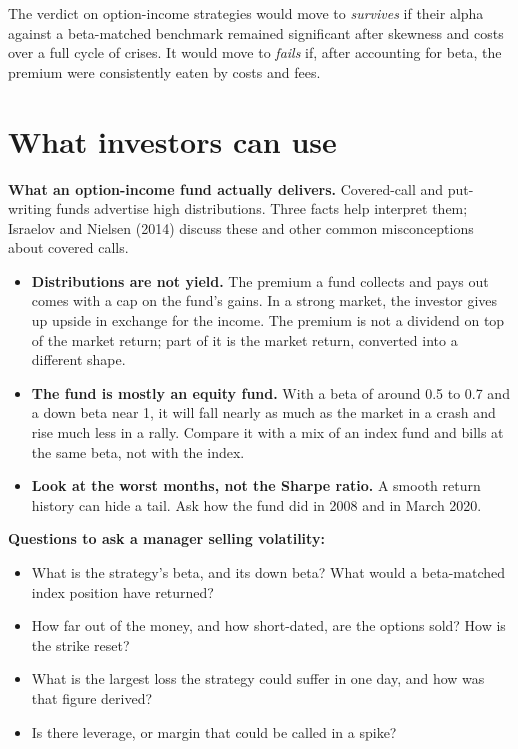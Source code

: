 The verdict on option-income strategies would move to \emph{survives} if their alpha against a beta-matched benchmark remained significant after skewness and costs over a full cycle of crises. It would move to \emph{fails} if, after accounting for beta, the premium were consistently eaten by costs and fees.

\section{What investors can use}
\label{sec:14-investors}

\textbf{What an option-income fund actually delivers.} Covered-call and put-writing funds advertise high distributions. Three facts help interpret them; Israelov and Nielsen (2014) discuss these and other common misconceptions about covered calls.

\begin{itemize}
  \item \textbf{Distributions are not yield.} The premium a fund collects and pays out comes with a cap on the fund's gains. In a strong market, the investor gives up upside in exchange for the income. The premium is not a dividend on top of the market return; part of it is the market return, converted into a different shape.
  \item \textbf{The fund is mostly an equity fund.} With a beta of around 0.5 to 0.7 and a down beta near 1, it will fall nearly as much as the market in a crash and rise much less in a rally. Compare it with a mix of an index fund and bills at the same beta, not with the index.
  \item \textbf{Look at the worst months, not the Sharpe ratio.} A smooth return history can hide a tail. Ask how the fund did in 2008 and in March 2020.
\end{itemize}

\textbf{Questions to ask a manager selling volatility:}

\begin{itemize}
  \item What is the strategy's beta, and its down beta? What would a beta-matched index position have returned?
  \item How far out of the money, and how short-dated, are the options sold? How is the strike reset?
  \item What is the largest loss the strategy could suffer in one day, and how was that figure derived?
  \item Is there leverage, or margin that could be called in a spike?
\end{itemize}

